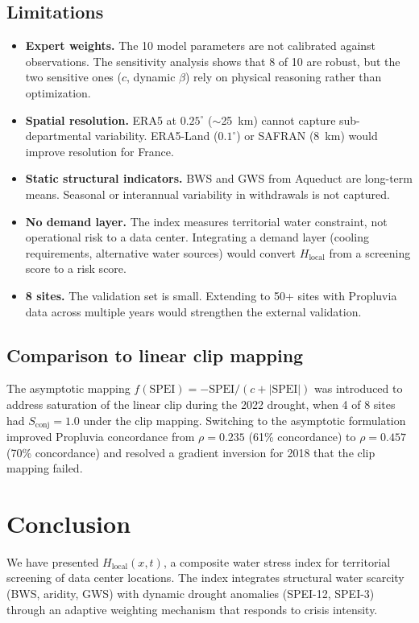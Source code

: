 \documentclass[11pt,a4paper]{article}
\begin{document}
\subsection{Limitations}

\begin{itemize}
  \item \textbf{Expert weights.} The 10 model parameters are not calibrated against observations. The sensitivity analysis shows that 8 of 10 are robust, but the two sensitive ones ($c$, dynamic $\beta$) rely on physical reasoning rather than optimization.
  \item \textbf{Spatial resolution.} ERA5 at $0.25^\circ$ ($\sim$25~km) cannot capture sub-departmental variability. ERA5-Land ($0.1^\circ$) or SAFRAN (8~km) would improve resolution for France.
  \item \textbf{Static structural indicators.} BWS and GWS from Aqueduct are long-term means. Seasonal or interannual variability in withdrawals is not captured.
  \item \textbf{No demand layer.} The index measures territorial water constraint, not operational risk to a data center. Integrating a demand layer (cooling requirements, alternative water sources) would convert $H_{\text{local}}$ from a screening score to a risk score.
  \item \textbf{8 sites.} The validation set is small. Extending to 50+ sites with Propluvia data across multiple years would strengthen the external validation.
\end{itemize}

\subsection{Comparison to linear clip mapping}

The asymptotic mapping $f(\text{SPEI}) = -\text{SPEI}/(c + |\text{SPEI}|)$ was introduced to address saturation of the linear clip during the 2022 drought, when 4 of 8 sites had $S_{\text{conj}} = 1.0$ under the clip mapping. Switching to the asymptotic formulation improved Propluvia concordance from $\rho = 0.235$ (61\% concordance) to $\rho = 0.457$ (70\% concordance) and resolved a gradient inversion for 2018 that the clip mapping failed.

\section{Conclusion}

We have presented $H_{\text{local}}(x,t)$, a composite water stress index for territorial screening of data center locations. The index integrates structural water scarcity (BWS, aridity, GWS) with dynamic drought anomalies (SPEI-12, SPEI-3) through an adaptive weighting mechanism that responds to crisis intensity.
\end{document}
